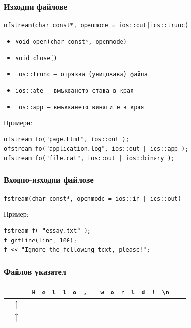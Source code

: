 \documentclass{beamer}
\begin{document}
\begin{frame}[fragile]
  \frametitle{Изходни файлове}

  \verb#ofstream(char const*, openmode = ios::out|ios::trunc)#
  \vspace{1em}

  \begin{itemize}
  \item \verb#void open(char const*, openmode)#
  \item \verb#void close()#
  \item \tt{ios::trunc} --- отрязва (унищожава) файла
  \item \tt{ios::ate} --- вмъкването става в края
  \item \tt{ios::app} --- вмъкването винаги е в края
  \end{itemize}
  \vspace{1em}

  Примери:
\begin{verbatim}
ofstream fo("page.html", ios::out );
ofstream fo("application.log", ios::out | ios::app );
ofstream fo("file.dat", ios::out | ios::binary );
\end{verbatim}

\end{frame}

\begin{frame}[fragile]
  \frametitle{Входно-изходни файлове}

  \verb#fstream(char const*, openmode = ios::in | ios::out)#
  \vspace{1em}
  
  Пример:
\begin{verbatim}
fstream f( "essay.txt" );
f.getline(line, 100);
f << "Ignore the following text, please!";
\end{verbatim}
\end{frame}

\begin{frame}[<1-2>]
  \frametitle{Файлов указател}
  \newcommand{\pta}{\phantom{\tt a}}

  \begin{tabular}{|c|c|c|c|c|c|c|c|c|c|c|c|c|c|c|c|c|c|c|}
    \rowcolor{diagramblue}
    \hline
    \pta&\pta&\pta&\tt H&\tt e&\tt l&\tt l&\tt o&\tt ,&\pta&\tt w&\tt o&\tt r&\tt l&\tt d&\tt !&\tt{\textbackslash n}&\pta&\pta

    {\\\hline
    \rowcolor{white}
    \multicolumn{3}{c}{}&\multicolumn{1}{c}{$\big\uparrow\!$}&\multicolumn{15}{c}{}}
    {\\\hline
    \rowcolor{white}
    \multicolumn{9}{c}{}&\multicolumn{1}{c}{$\big\uparrow\!$}&\multicolumn{9}{c}{}}
  \end{tabular}
  \pause

\end{frame}
\end{document}
